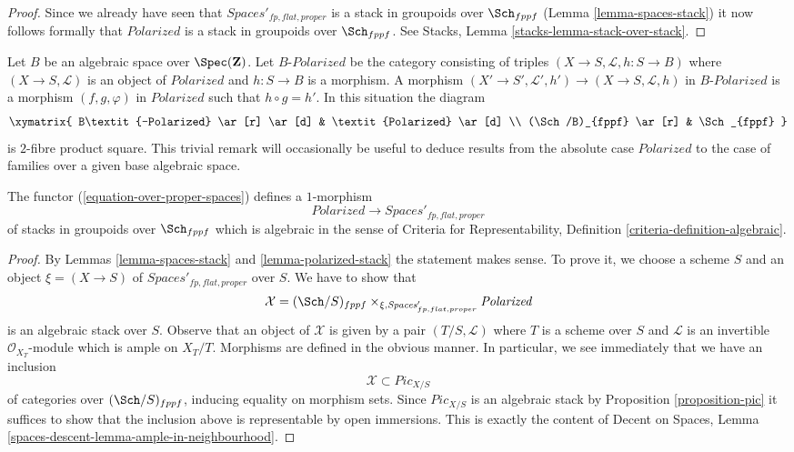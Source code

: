 \begin{proof}
\medskip\noindent
Since we already have seen that $\textit{Spaces}'_{fp, flat, proper}$
is a stack in groupoids over $\Sch_{fppf}$
(Lemma \ref{lemma-spaces-stack}) it now follows formally
that $\textit{Polarized}$ is a stack in groupoids over $\Sch_{fppf}$.
See Stacks, Lemma \ref{stacks-lemma-stack-over-stack}.
\end{proof}

\begin{remark}
\label{remark-polarized-base-change}
Let $B$ be an algebraic space over $\Spec(\mathbf{Z})$.
Let $B\textit{-Polarized}$ be the category consisting
of triples $(X \to S, \mathcal{L}, h : S \to B)$
where $(X \to S, \mathcal{L})$ is an object of
$\textit{Polarized}$ and $h : S \to B$ is a morphism.
A morphism $(X' \to S', \mathcal{L}', h') \to (X \to S, \mathcal{L}, h)$
in $B\textit{-Polarized}$ is a morphism $(f, g, \varphi)$
in $\textit{Polarized}$ such that $h \circ g = h'$.
In this situation the diagram
$$
\xymatrix{
B\textit{-Polarized} \ar[r] \ar[d] & \textit{Polarized} \ar[d] \\
(\Sch/B)_{fppf} \ar[r] & \Sch_{fppf}
}
$$
is $2$-fibre product square. This trivial remark
will occasionally be useful to deduce results from
the absolute case $\textit{Polarized}$ to the case
of families over a given base algebraic space.
\end{remark}

\begin{lemma}
\label{lemma-polarized-to-spaces-algebraic}
The functor (\ref{equation-over-proper-spaces}) defines a $1$-morphism
$$
\textit{Polarized} \to \textit{Spaces}'_{fp, flat, proper}
$$
of stacks in groupoids over $\Sch_{fppf}$
which is algebraic in the sense of
Criteria for Representability, Definition
\ref{criteria-definition-algebraic}.
\end{lemma}

\begin{proof}
By Lemmas \ref{lemma-spaces-stack} and \ref{lemma-polarized-stack}
the statement makes sense. To prove it, we choose a scheme $S$
and an object $\xi = (X \to S)$ of $\textit{Spaces}'_{fp, flat, proper}$
over $S$. We have to show that
$$
\mathcal{X} = (\Sch/S)_{fppf} \times_{\xi, \textit{Spaces}'_{fp, flat, proper}}
\textit{Polarized}
$$
is an algebraic stack over $S$. Observe that an object of $\mathcal{X}$
is given by a pair $(T/S, \mathcal{L})$ where $T$ is a scheme
over $S$ and $\mathcal{L}$ is an invertible $\mathcal{O}_{X_T}$-module
which is ample on $X_T/T$. Morphisms are defined in the obvious manner.
In particular, we see immediately that we have an inclusion
$$
\mathcal{X} \subset \textit{Pic}_{X/S}
$$
of categories over $(\Sch/S)_{fppf}$, inducing equality on morphism
sets. Since $\textit{Pic}_{X/S}$ is an algebraic stack by
Proposition \ref{proposition-pic} it suffices to show that the inclusion
above is representable by open immersions. This is exactly the content
of Decent on Spaces, Lemma
\ref{spaces-descent-lemma-ample-in-neighbourhood}.
\end{proof}

